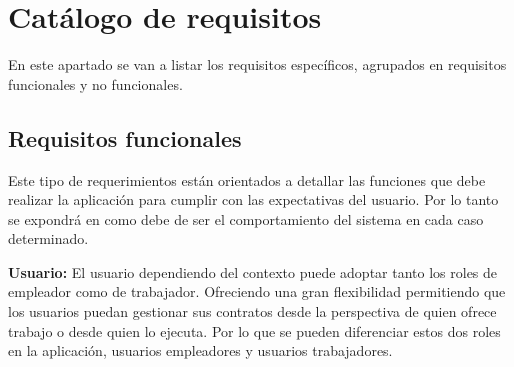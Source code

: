 \section{Catálogo de requisitos}

En este apartado se van a listar los requisitos específicos, agrupados en requisitos funcionales y no funcionales.


\subsection{Requisitos funcionales}

Este tipo de requerimientos están orientados a detallar las funciones que debe realizar la aplicación para cumplir con las expectativas del usuario. Por lo tanto se expondrá en como debe de ser el comportamiento del sistema en cada caso determinado.

\begin{description}
\item \textbf{Usuario:} El usuario dependiendo del contexto puede adoptar tanto los roles de empleador como de trabajador. Ofreciendo una gran flexibilidad permitiendo que los usuarios puedan gestionar sus contratos desde la perspectiva de quien ofrece trabajo o desde quien lo ejecuta.
Por lo que se pueden diferenciar estos dos roles en la aplicación, usuarios empleadores y usuarios trabajadores.
\end{description}

